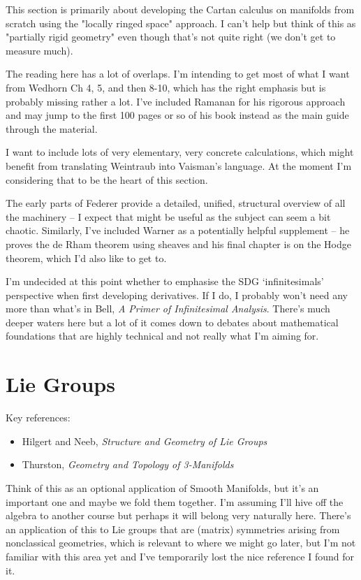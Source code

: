\documentclass[article]{article}
\begin{document}
This section is primarily about developing the Cartan calculus on manifolds from scratch using the "locally ringed space" approach. I can't help but think of this as "partially rigid geometry" even though that's not quite right (we don't get to measure much).

The reading here has a lot of overlaps. I'm intending to get most of what I want from Wedhorn Ch 4, 5, and then 8-10, which has the right emphasis but is probably missing rather a lot. I've included Ramanan for his rigorous approach and may jump to the first 100 pages or so of his book instead as the main guide through the material.

I want to include lots of very elementary, very concrete calculations, which might benefit from translating Weintraub into Vaisman's language. At the moment I'm considering that to be the heart of this section.

The early parts of Federer provide a detailed, unified, structural overview of all the machinery -- I expect that might be useful as the subject can seem a bit chaotic. Similarly, I've included Warner as a potentially helpful supplement -- he proves the de Rham theorem using sheaves and his final chapter is on the Hodge theorem, which I'd also like to get to.

I'm undecided at this point whether to emphasise the SDG `infinitesimals' perspective when first developing derivatives. If I do, I probably won't need any more than what's in Bell, \textit{A Primer of Infinitesimal Analysis}. There's much deeper waters here but a lot of it comes down to debates about mathematical foundations that are highly technical and not really what I'm aiming for.

\section{Lie Groups}
Key references:
\begin{itemize}
	\item{Hilgert and Neeb, \textit{Structure and Geometry of Lie Groups}}
	\item{Thurston, \textit{Geometry and Topology of 3-Manifolds}}
\end{itemize}

Think of this as an optional application of Smooth Manifolds, but it's an important one and maybe we fold them together. I'm assuming I'll hive off the algebra to another course but perhaps it will belong very naturally here. There's an application of this to Lie groups that are (matrix) symmetries arising from nonclassical geometries, which is relevant to where we might go later, but I'm not familiar with this area yet and I've temporarily lost the nice reference I found for it. 
\end{document}
